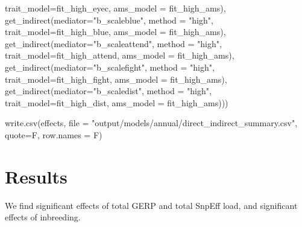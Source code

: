 \documentclass[
  letterpaper,
  DIV=11,
  numbers=noendperiod]{scrreprt}
\newenvironment{Shaded}{}{}
\newcommand{\AttributeTok}[1]{\textcolor[rgb]{0.84,0.23,0.29}{#1}}
\newcommand{\FunctionTok}[1]{\textcolor[rgb]{0.44,0.26,0.76}{#1}}
\newcommand{\NormalTok}[1]{\textcolor[rgb]{0.14,0.16,0.18}{#1}}
\newcommand{\StringTok}[1]{\textcolor[rgb]{0.01,0.18,0.38}{#1}}
\begin{document}
\begin{Shaded}
\begin{Highlighting}[]
                                         \AttributeTok{trait\_model=}\NormalTok{fit\_high\_eyec, }\AttributeTok{ams\_model =}\NormalTok{ fit\_high\_ams),}
                            \FunctionTok{get\_indirect}\NormalTok{(}\AttributeTok{mediator=}\StringTok{"b\_scaleblue"}\NormalTok{,  }\AttributeTok{method =} \StringTok{"high"}\NormalTok{, }
                                         \AttributeTok{trait\_model=}\NormalTok{fit\_high\_blue, }\AttributeTok{ams\_model =}\NormalTok{ fit\_high\_ams),}
                            \FunctionTok{get\_indirect}\NormalTok{(}\AttributeTok{mediator=}\StringTok{"b\_scaleattend"}\NormalTok{,  }\AttributeTok{method =} \StringTok{"high"}\NormalTok{, }
                                         \AttributeTok{trait\_model=}\NormalTok{fit\_high\_attend, }\AttributeTok{ams\_model =}\NormalTok{ fit\_high\_ams),}
                            \FunctionTok{get\_indirect}\NormalTok{(}\AttributeTok{mediator=}\StringTok{"b\_scalefight"}\NormalTok{,  }\AttributeTok{method =} \StringTok{"high"}\NormalTok{, }
                                         \AttributeTok{trait\_model=}\NormalTok{fit\_high\_fight, }\AttributeTok{ams\_model =}\NormalTok{ fit\_high\_ams),}
                            \FunctionTok{get\_indirect}\NormalTok{(}\AttributeTok{mediator=}\StringTok{"b\_scaledist"}\NormalTok{,  }\AttributeTok{method =} \StringTok{"high"}\NormalTok{, }
                                         \AttributeTok{trait\_model=}\NormalTok{fit\_high\_dist, }\AttributeTok{ams\_model =}\NormalTok{ fit\_high\_ams)))}


\FunctionTok{write.csv}\NormalTok{(effects, }\AttributeTok{file =} \StringTok{"output/models/annual/direct\_indirect\_summary.csv"}\NormalTok{, }\AttributeTok{quote=}\NormalTok{F, }\AttributeTok{row.names =}\NormalTok{ F)}
\end{Highlighting}
\end{Shaded}

\section{Results}\label{results-2}

We find significant effects of total GERP and total SnpEff load, and
significant effects of inbreeding.
\end{document}
